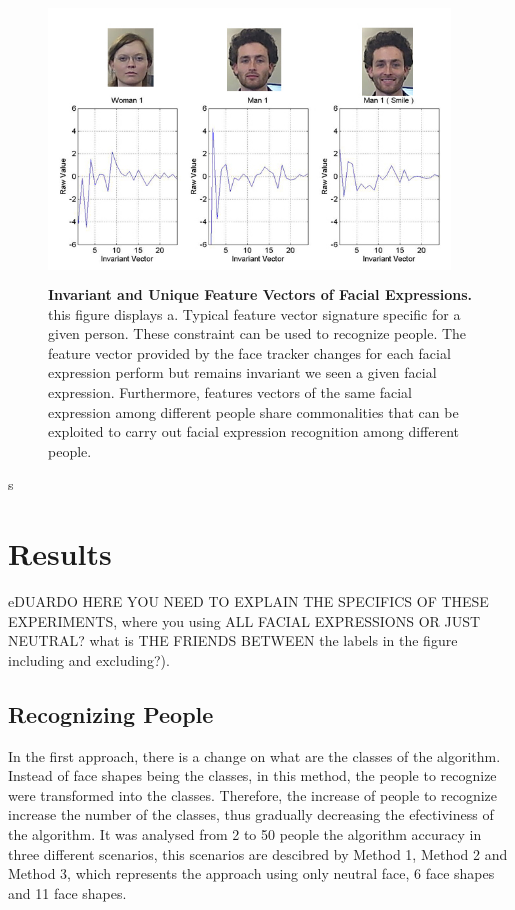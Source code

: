 \documentclass[]{article}
\begin{document}
\begin{figure}[ht]
\begin{center}
\vspace{-3mm}
\includegraphics[width=0.95\textwidth,height=75mm]{figures/comparationBetweenFaces2.jpg}
\end{center}
\caption{\textbf{Invariant and Unique Feature Vectors of Facial Expressions.} this figure displays a. Typical feature 
vector signature specific for a given person. These constraint can be used to recognize people. The feature vector
provided by the face tracker changes for each facial expression perform but remains invariant we seen a given facial 
expression. Furthermore, features vectors of the same facial expression among different people share commonalities that
can be exploited to carry out facial expression recognition among different people.}
\label{comparationBetweenFaces}
\end{figure}s

\section{Results}


 eDUARDO HERE YOU NEED TO EXPLAIN THE SPECIFICS OF THESE EXPERIMENTS, where you using ALL
FACIAL EXPRESSIONS OR JUST NEUTRAL? what is THE FRIENDS BETWEEN the labels in the figure including and excluding?).

\subsection{Recognizing People}

In the first approach, there is a change on what are the classes of the
algorithm. Instead of face shapes being the classes, in this method, the people
to recognize were transformed into the classes. Therefore, the increase of
people to recognize increase the number of the classes, thus gradually
decreasing the efectiviness of the algorithm. It was analysed from 2 to 50
people the algorithm accuracy in three different scenarios, this scenarios are
descibred by Method 1, Method 2 and Method 3, which represents the approach
using only neutral face, 6 face shapes and 11 face shapes.
\end{document}

